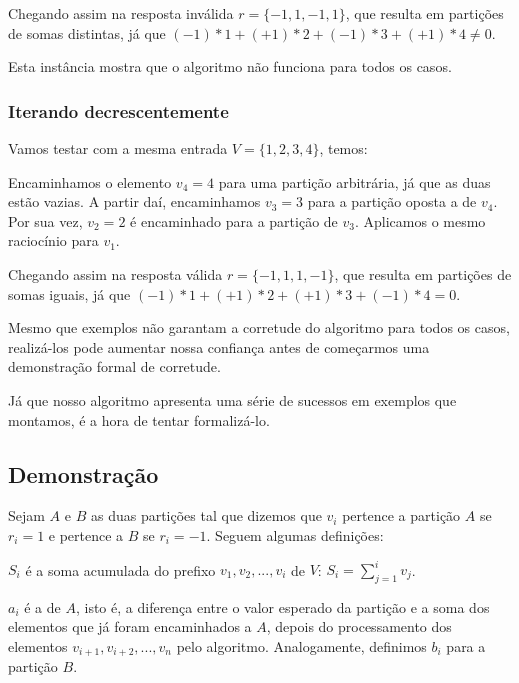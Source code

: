 Chegando assim na resposta inválida $r = \{-1, 1, -1, 1\}$, que resulta em partições de somas distintas, já que $(-1)*1 + (+1)*2 + (-1)*3 + (+1)*4 \neq 0$.

Esta instância mostra que o algoritmo não funciona para todos os casos.

\subsubsection*{Iterando decrescentemente}

Vamos testar com a mesma entrada $V = \{1, 2, 3, 4\}$, temos:

Encaminhamos o elemento $v_4 = 4$ para uma partição arbitrária, já que as duas estão vazias. A partir daí, encaminhamos $v_3 = 3$ para a partição oposta a de $v_4$. Por sua vez, $v_2 = 2$ é encaminhado para a partição de $v_3$. Aplicamos o mesmo raciocínio para $v_1$.

Chegando assim na resposta válida $r = \{-1, 1, 1, -1\}$, que resulta em partições de somas iguais, já que $(-1)*1 + (+1)*2 + (+1)*3 + (-1)*4 = 0$.

Mesmo que exemplos não garantam a corretude do algoritmo para todos os casos, realizá-los pode aumentar nossa confiança antes de começarmos uma demonstração formal de corretude.

Já que nosso algoritmo apresenta uma série de sucessos em exemplos que montamos, é a hora de tentar formalizá-lo.

\subsection*{Demonstração}

Sejam $A$ e $B$ as duas partições tal que dizemos que $v_i$ pertence a partição $A$ se $r_i = 1$ e pertence a $B$ se $r_i = -1$. Seguem algumas definições:

\begin{defi}
$S_i$ é a soma acumulada do prefixo $v_1, v_2, ..., v_i$ de $V$: $S_i = \sum_{j = 1}^{i} v_j$.
\end{defi}

\begin{defi}
$a_i$ é a  de $A$, isto é, a diferença entre o valor esperado da partição e a soma dos elementos que já foram encaminhados a $A$, depois do processamento dos elementos $v_{i + 1}, v_{i + 2}, ..., v_{n}$ pelo algoritmo.
Analogamente, definimos $b_i$ para a partição $B$.
\end{defi}

